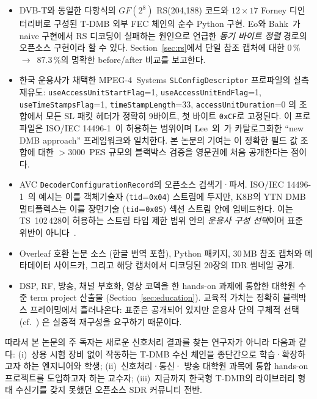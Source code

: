 \documentclass[11pt,a4paper]{article}
\begin{document}
\begin{itemize}[leftmargin=*,nosep]
\item DVB-T와 동일한 다항식의 $GF(2^8)$ RS(204,188) 코드와 $12\times17$
       Forney 디인터리버로 구성된 T-DMB 외부 FEC 체인의 순수 Python
       구현.  Eo와 Bahk~\cite{eo2024tdmb}가 naive 구현에서 RS 디코딩이
       실패하는 원인으로 언급한 \emph{동기 바이트 정렬} 경로의 오픈소스
       구현이라 할 수 있다.  Section~\ref{sec:rs}에서 단일 참조 캡처에
       대한 0\,\%~$\to$~87.3\,\%의 명확한 before/after 비교를 보고한다.
\item 한국 운용사가 채택한 MPEG-4~Systems
       \texttt{SLConfigDescriptor} 프로파일의 실측 재유도:
       \texttt{useAccessUnitStartFlag}=1,
       \texttt{useAccessUnitEndFlag}=1,
       \texttt{useTimeStampsFlag}=1,
       \texttt{timeStampLength}=33,
       \texttt{accessUnitDuration}=0 의 조합에서 모든 SL 패킷 헤더가
       정확히 9바이트, 첫 바이트 \texttt{0xCF}로 고정된다.  이 프로파일은
       ISO/IEC 14496-1~\cite{iso14496-1}이 허용하는 범위이며
       Lee~외~\cite{lee2004m4smux}가 카탈로그화한 ``new DMB approach''
       프레임워크와 일치한다.  본 논문의 기여는 이 정확한 필드 값
       조합에 대한 ${>}3000$~PES 규모의 블랙박스 검증을 영문권에
       처음 공개한다는 점이다.
\item AVC \texttt{DecoderConfigurationRecord}의 오픈소스 검색기·파서.
       ISO/IEC 14496-1~\cite{iso14496-1}의 예시는 이를 객체기술자
       (\texttt{tid}=\texttt{0x04}) 스트림에 두지만, K8B의 YTN DMB
       멀티플렉스는 이를 장면기술 (\texttt{tid}=\texttt{0x05})
       섹션 스트림 안에 임베드한다.  이는 TS~102\,428이 허용하는
       스트림 타입 제한 범위 안의 \emph{운용사 구성 선택}이며 표준
       위반이 아니다~\cite{etsi102428}.
\item Overleaf 호환 논문 소스 (한글 번역 포함), Python 패키지,
       30\,MB 참조 캡처와 메타데이터 사이드카, 그리고 해당 캡처에서
       디코딩된 20장의 IDR 썸네일 공개.
\item DSP, RF, 방송, 채널 부호화, 영상 코덱을 한 hands-on 과제에
       통합한 대학원 수준 term project 산출물
       (Section~\ref{sec:education}).  교육적 가치는 정확히
       블랙박스 프레이밍에서 흘러나온다: 표준은 공개되어 있지만
       운용사 단의 구체적 선택 (cf.~\cite{lee2004m4smux}) 은
       실증적 재구성을 요구하기 때문이다.
\end{itemize}

따라서 본 논문의 주 독자는 새로운 신호처리 결과를 찾는 연구자가 아니라
다음과 같다: (i)~상용 시험 장비 없이 작동하는 T-DMB 수신 체인을
종단간으로 학습·확장하고자 하는 엔지니어와 학생; (ii)~신호처리·통신·
방송 대학원 과목에 통합 hands-on 프로젝트를 도입하고자 하는 교수자;
(iii)~지금까지 한국형 T-DMB의 라이브러리 형태 수신기를 갖지 못했던
오픈소스 SDR 커뮤니티 전반.
\end{document}
